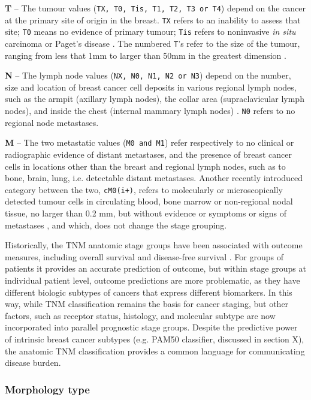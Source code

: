     \textbf{T} – The tumour values (\texttt{TX, T0, Tis, T1, T2, T3 or T4}) depend on the cancer at the primary site of origin in the breast. \texttt{TX} refers to an inability to assess that site; \texttt{T0} means no evidence of primary tumour;  \texttt{Tis} refers to noninvasive \textit{in situ} carcinoma or Paget's disease \cite{Giuliano2017}. The numbered \texttt{T}'s refer to the size of the tumour, ranging from less that 1mm to larger than 50mm in the greatest dimension \cite{2017AJCCStaging}. 

    \textbf{N} – The lymph node values (\texttt{NX, N0, N1, N2 or N3}) depend on the number, size and location of breast cancer cell deposits in various regional lymph nodes, such as the armpit (axillary lymph nodes), the collar area (supraclavicular lymph nodes), and inside the chest (internal mammary lymph nodes) \cite{scatarige1990}. \texttt{N0} refers to no regional node metastases. 
    
    
    \textbf{M} – The two metastatic values (\texttt{M0 and M1}) refer respectively to no clinical or radiographic evidence of distant metastases, and the presence of breast cancer cells in locations other than the breast and regional lymph nodes, such as to bone, brain, lung, i.e. detectable distant metastases. Another recently introduced category between the two, \texttt{cM0(i+)}, refers to molecularly or microscopically detected tumour cells in circulating blood, bone marrow or non-regional nodal tissue, no larger than 0.2 mm, but without evidence or symptoms or signs of metastases \cite{Giuliano2017}, and which, does not change the stage grouping. 
    
    
    Historically, the TNM anatomic stage groups have been associated with outcome measures, including overall survival and disease-free survival \cite{Giuliano2017}.  For groups of patients it provides an accurate prediction of outcome, but within stage groups at individual patient level, outcome predictions are more problematic, as they have different biologic subtypes of cancers that express different biomarkers. In this way, while TNM classification remains the basis for cancer staging, but other factors, such as receptor status, histology, and molecular subtype are now incorporated into parallel prognostic stage groups. Despite the predictive power of intrinsic breast cancer subtypes (e.g. PAM50 classifier, discussed in section X),  the anatomic TNM classification provides a common language for communicating disease burden.

   \subsubsection{Morphology type}
   
